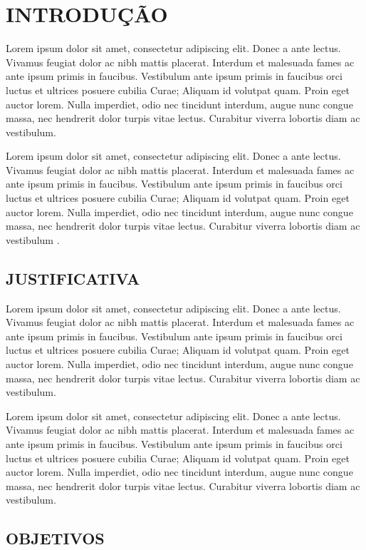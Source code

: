 \chapter{INTRODUÇÃO}
\label{chp:intro}

Lorem ipsum dolor sit amet, consectetur adipiscing elit. Donec a ante lectus. Vivamus feugiat dolor ac nibh mattis placerat. Interdum et malesuada fames ac ante ipsum primis in faucibus. Vestibulum ante ipsum primis in faucibus orci luctus et ultrices posuere cubilia Curae; Aliquam id volutpat quam. Proin eget auctor lorem. Nulla imperdiet, odio nec tincidunt interdum, augue nunc congue massa, nec hendrerit dolor turpis vitae lectus. Curabitur viverra lobortis diam ac vestibulum.

Lorem ipsum dolor sit amet, consectetur adipiscing elit. Donec a ante lectus. Vivamus feugiat dolor ac nibh mattis placerat. Interdum et malesuada fames ac ante ipsum primis in faucibus. Vestibulum ante ipsum primis in faucibus orci luctus et ultrices posuere cubilia Curae; Aliquam id volutpat quam. Proin eget auctor lorem. Nulla imperdiet, odio nec tincidunt interdum, augue nunc congue massa, nec hendrerit dolor turpis vitae lectus. Curabitur viverra lobortis diam ac vestibulum \cite{Taurion2009}.

\section{JUSTIFICATIVA}
Lorem ipsum dolor sit amet, consectetur adipiscing elit. Donec a ante lectus. Vivamus feugiat dolor ac nibh mattis placerat. Interdum et malesuada fames ac ante ipsum primis in faucibus. Vestibulum ante ipsum primis in faucibus orci luctus et ultrices posuere cubilia Curae; Aliquam id volutpat quam. Proin eget auctor lorem. Nulla imperdiet, odio nec tincidunt interdum, augue nunc congue massa, nec hendrerit dolor turpis vitae lectus. Curabitur viverra lobortis diam ac vestibulum.

Lorem ipsum dolor sit amet, consectetur adipiscing elit. Donec a ante lectus. Vivamus feugiat dolor ac nibh mattis placerat. Interdum et malesuada fames ac ante ipsum primis in faucibus. Vestibulum ante ipsum primis in faucibus orci luctus et ultrices posuere cubilia Curae; Aliquam id volutpat quam. Proin eget auctor lorem. Nulla imperdiet, odio nec tincidunt interdum, augue nunc congue massa, nec hendrerit dolor turpis vitae lectus. Curabitur viverra lobortis diam ac vestibulum.

\section{OBJETIVOS}

